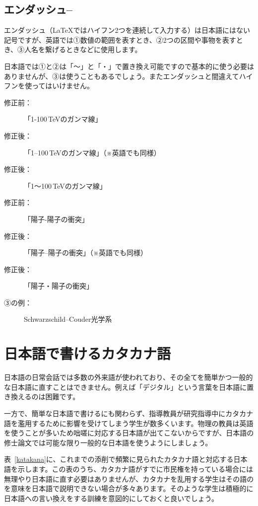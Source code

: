 \subsection{エンダッシュ--}

エンダッシュ（\LaTeX ではハイフン2つを連続して入力する）は日本語にはない記号ですが、英語では①数値の範囲を表すとき、②2つの区間や事物を表すとき、③人名を繋げるときなどに使用します。

日本語では①と②は「〜」と「・」で置き換え可能ですので基本的に使う必要はありませんが、③は使うこともあるでしょう。またエンダッシュと間違えてハイフンを使ってはいけません。

\begin{description}
\item[修正前：]「1-100\,TeVのガンマ線」
\item[修正後：]「1--100\,TeVのガンマ線」（※英語でも同様）
\item[修正後：]「1〜100\,TeVのガンマ線」
\end{description}

\begin{description}
\item[修正前：]「陽子-陽子の衝突」
\item[修正後：]「陽子--陽子の衝突」（※英語でも同様）
\item[修正後：]「陽子・陽子の衝突」
\end{description}

\begin{description}
\item[③の例：]Schwarzschild--Couder光学系
\end{description}

\section{日本語で書けるカタカナ語}

日本語の日常会話では多数の外来語が使われており、その全てを簡単かつ一般的な日本語に直すことはできません。例えば「デジタル」という言葉を日本語に置き換えるのは困難です。

一方で、簡単な日本語で書けるにも関わらず、指導教員が研究指導中にカタカナ語を濫用するために影響を受けてしまう学生が数多くいます。物理の教員は英語を使うことが多いため咄嗟に対応する日本語が出てこないからですが、日本語の修士論文では可能な限り一般的な日本語を使うようにしましょう。

表~\ref{katakana}に、これまでの添削で頻繁に見られたカタカナ語と対応する日本語を示します。この表のうち、カタカナ語がすでに市民権を持っている場合には無理やり日本語に直す必要はありませんが、カタカナを乱用する学生はその語のを意味を日本語で説明できない場合が多々あります。そのような学生は積極的に日本語への言い換えをする訓練を意図的にしておくと良いでしょう。

